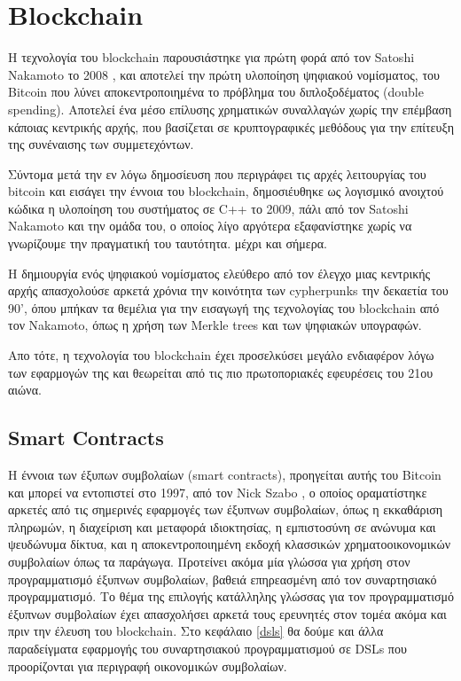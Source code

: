 \section{Blockchain}

Η τεχνολογία του blockchain παρουσιάστηκε για πρώτη φορά από τον Satoshi Nakamoto το 2008 
\cite{bitcoin}, και αποτελεί την πρώτη υλοποίηση ψηφιακού νομίσματος, του Bitcoin που λύνει αποκεντροποιημένα το πρόβλημα του διπλοξοδέματος (double spending). Αποτελεί ένα μέσο επίλυσης χρηματικών συναλλαγών χωρίς την επέμβαση κάποιας κεντρικής αρχής, που βασίζεται σε κρυπτογραφικές μεθόδους για την επίτευξη της συνέναισης των συμμετεχόντων.

Σύντομα μετά την εν λόγω δημοσίευση που περιγράφει τις αρχές λειτουργίας του bitcoin και εισάγει
την έννοια του blockchain, δημοσιέυθηκε ως λογισμικό ανοιχτού κώδικα η υλοποίηση του συστήματος
σε C++ το 2009, πάλι από τον Satoshi Nakamoto και την ομάδα του, ο οποίος λίγο αργότερα εξαφανίστηκε
χωρίς να  γνωρίζουμε την πραγματική του ταυτότητα. μέχρι και σήμερα. 


Η δημιουργία ενός ψηφιακού νομίσματος ελεύθερο από τον έλεγχο μιας κεντρικής αρχής απασχολούσε αρκετά χρόνια την κοινότητα των cypherpunks την δεκαετία του 90', όπου μπήκαν τα θεμέλια για την
εισαγωγή της τεχνολογίας του blockchain από τον Nakamoto, όπως η χρήση των Merkle trees και των ψηφιακών υπογραφών.

Απο τότε, η τεχνολογία του blockchain έχει προσελκύσει μεγάλο ενδιαφέρον λόγω των εφαρμογών της και
θεωρείται από τις πιο πρωτοποριακές εφευρέσεις του 21ου αιώνα. 


\subsection{ Smart Contracts}

Η έννοια των έξυπων συμβολαίων (smart contracts), προηγείται αυτής του Bitcoin και μπορεί να εντοπιστεί 
στο 1997, από τον Nick Szabo \cite{szabo1}, ο οποίος οραματίστηκε αρκετές από τις σημερινές εφαρμογές
των έξυπνων συμβολαίων, όπως η εκκαθάριση πληρωμών, η διαχείριση και μεταφορά ιδιοκτησίας,  η 
εμπιστοσύνη σε ανώνυμα και ψευδώνυμα δίκτυα, και η αποκεντροποιημένη εκδοχή κλασσικών χρηματοοικονομικών συμβολαίων όπως τα παράγωγα. Προτείνει ακόμα μία γλώσσα για χρήση στον 
προγραμματισμό έξυπνων συμβολαίων, βαθειά επηρεασμένη από τον συναρτησιακό προγραμματισμό.
Το θέμα της επιλογής κατάλληλης γλώσσας για τον προγραμματισμό έξυπνων συμβολαίων έχει  απασχολήσει
 αρκετά τους ερευνητές στον τομέα ακόμα και πριν την έλευση του blockchain. Στο κεφάλαιο \ref{dsls} θα
   δούμε και άλλα παραδείγματα εφαρμογής του συναρτησιακού προγραμματισμού σε DSLs που προορίζονται
   για περιγραφή οικονομικών συμβολαίων.

